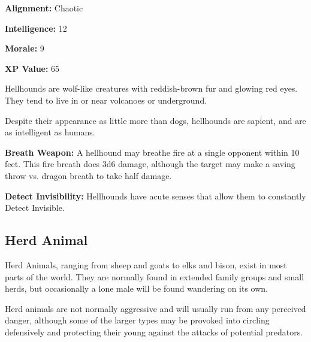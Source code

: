 \begin{multicols*}{2}
{\textbf{Alignment:} Chaotic

\textbf{Intelligence:} 12

\textbf{Morale:} 9

\textbf{XP Value:} 65}

Hellhounds are wolf-like creatures with reddish-brown fur and glowing red eyes. They tend to live in or near volcanoes or underground.

Despite their appearance as little more than dogs, hellhounds are sapient, and are as intelligent as humans.

\textbf{Breath Weapon:} A hellhound may breathe fire at a single opponent within 10 feet. This fire breath does 3d6 damage, although the target may make a saving throw vs. dragon breath to take half damage.

\textbf{Detect Invisibility:} Hellhounds have acute senses that allow them to constantly Detect Invisible.

\subsection{Herd Animal}

Herd Animals, ranging from sheep and goats to elks and bison, exist in most parts of the world. They are normally found in extended family groups and small herds, but occasionally a lone male will be found wandering on its own.

Herd animals are not normally aggressive and will usually run from any perceived danger, although some of the larger types may be provoked into circling defensively and protecting their young against the attacks of potential predators.


\end{multicols*}
